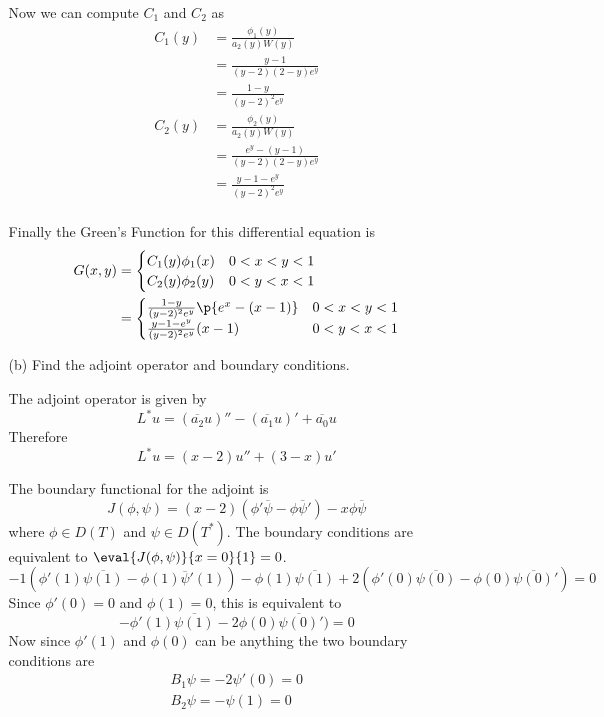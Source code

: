 \documentclass[11pt, oneside]{article}
\begin{document}
\begin{enumerate}
\begin{enumerate}
        Now we can compute $C_1$ and $C_2$ as
        \begin{align*}
          C_1(y) &= \frac{\phi_1(y)}{a_2(y) W(y)} \\
          &= \frac{y - 1}{(y - 2)(2 - y)e^y} \\
          &= \frac{1 - y}{(y - 2)^2 e^y} \\
          C_2(y) &= \frac{\phi_2(y)}{a_2(y) W(y)} \\
          &= \frac{e^y - (y - 1)}{(y - 2)(2 - y)e^y} \\
          &= \frac{y - 1 - e^y}{(y - 2)^2 e^y} \\
        \end{align*}

        Finally the Green's Function for this differential equation is
        \begin{align*}
          G(x, y) &=
          \begin{cases}
            C_1(y) \phi_1(x) & 0 < x < y < 1 \\
            C_2(y) \phi_2(y) & 0 < y < x < 1
          \end{cases} \\
          &=
          \begin{cases}
            \frac{1 - y}{(y - 2)^2 e^y} \p{e^x - (x - 1)} & 0 < x < y < 1 \\
            \frac{y - 1 - e^y}{(y - 2)^2 e^y} (x - 1) & 0 < y < x < 1
          \end{cases}
        \end{align*}

      \item[(b)]
        Find the adjoint operator and boundary conditions.

        The adjoint operator is given by
        \[
          L^* u = (\overline{a_2} u)'' - (\overline{a_1}u)' + \overline{a_0}u
        \]
        Therefore
        \[
          L^* u = (x - 2)u'' + (3 - x)u'
        \]

        The boundary functional for the adjoint is
        \[
          J(\phi, \psi) = (x - 2)(\phi' \overline{\psi} - \phi \overline{\psi}') - x \phi \overline{\psi}
        \]
        where $\phi \in D(T)$ and $\psi \in D(T^*)$.
        The boundary conditions are equivalent to $\eval{J(\phi, \psi)}{x = 0}{1} = 0$.
        \[
          -1(\phi'(1) \overline{\psi(1)} - \phi(1) \overline{\psi}'(1)) - \phi(1) \overline{\psi(1)} + 2(\phi'(0) \overline{\psi(0)} - \phi(0) \overline{\psi(0)}') = 0
        \]
        Since $\phi'(0) = 0$ and $\phi(1) = 0$, this is equivalent to
        \[
          -\phi'(1) \overline{\psi(1)} - 2\phi(0) \overline{\psi(0)}') = 0
        \]
        Now since $\phi'(1)$ and $\phi(0)$ can be anything the two boundary conditions are
        \begin{align*}
          B_1 \psi = -2\psi'(0) = 0 \\
          B_2 \psi = -\psi(1) = 0 \\
        \end{align*}
    \end{enumerate}


\end{enumerate}
\end{document}
